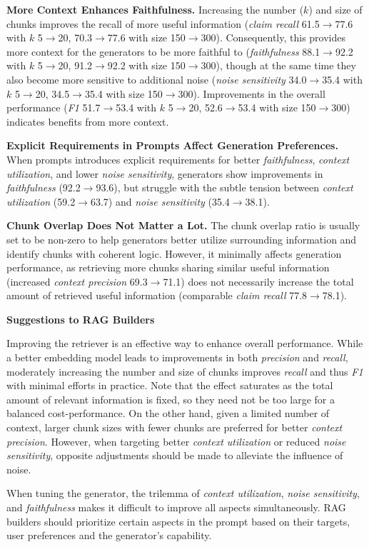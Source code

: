 \textbf{More Context Enhances Faithfulness.}
Increasing the number ($k$) and size of chunks improves the recall of more useful information (\emph{claim recall} 61.5$\rightarrow$77.6 with $k$ 5$\rightarrow$20, 70.3$\rightarrow$77.6 with size 150$\rightarrow$300). Consequently, this provides more context for the generators to be more faithful to (\emph{faithfulness} 88.1$\rightarrow$92.2 with $k$ 5$\rightarrow$20, 91.2$\rightarrow$92.2 with size 150$\rightarrow$300), though at the same time they also become more sensitive to additional noise (\emph{noise sensitivity} 34.0$\rightarrow$35.4 with $k$ 5$\rightarrow$20, 34.5$\rightarrow$35.4 with size 150$\rightarrow$300). Improvements in the overall performance (\emph{F1} 51.7$\rightarrow$53.4 with $k$ 5$\rightarrow$20, 52.6$\rightarrow$53.4 with size 150$\rightarrow$300) indicates benefits from more context.

\textbf{Explicit Requirements in Prompts Affect Generation Preferences.}  When prompts introduces explicit requirements for better \emph{faithfulness}, \emph{context utilization}, and lower \emph{noise sensitivity}, generators show improvements in \emph{faithfulness} (92.2$\rightarrow$93.6), but struggle with the subtle tension between \emph{context utilization} (59.2$\rightarrow$63.7) and \emph{noise sensitivity} (35.4$\rightarrow$38.1).

\textbf{Chunk Overlap Does Not Matter a Lot.} The chunk overlap ratio is usually set to be non-zero to help generators better utilize surrounding information and identify chunks with coherent logic. However, it minimally affects generation performance, as retrieving more chunks sharing similar useful information (increased \emph{context precision} 69.3$\rightarrow$71.1) does not necessarily increase the total amount of retrieved useful information (comparable \emph{claim recall} 77.8$\rightarrow$78.1).

\textbf{Suggestions to RAG Builders}

Improving the retriever is an effective way to enhance overall performance. While a better embedding model leads to improvements in both \emph{precision} and \emph{recall}, moderately increasing the number and size of chunks improves \emph{recall} and thus \emph{F1} with minimal efforts in practice. Note that the effect saturates as the total amount of relevant information is fixed, so they need not be too large for a balanced cost-performance. On the other hand, given a limited number of context, larger chunk sizes with fewer chunks are preferred for better \emph{context precision}. However, when targeting better \emph{context utilization} or reduced \emph{noise sensitivity}, opposite adjustments should be made to alleviate the influence of noise.

When tuning the generator, the trilemma of \emph{context utilization}, \emph{noise sensitivity}, and \emph{faithfulness} makes it difficult to improve all aspects simultaneously. RAG builders should prioritize certain aspects in the prompt based on their targets, user preferences and the generator's capability.

